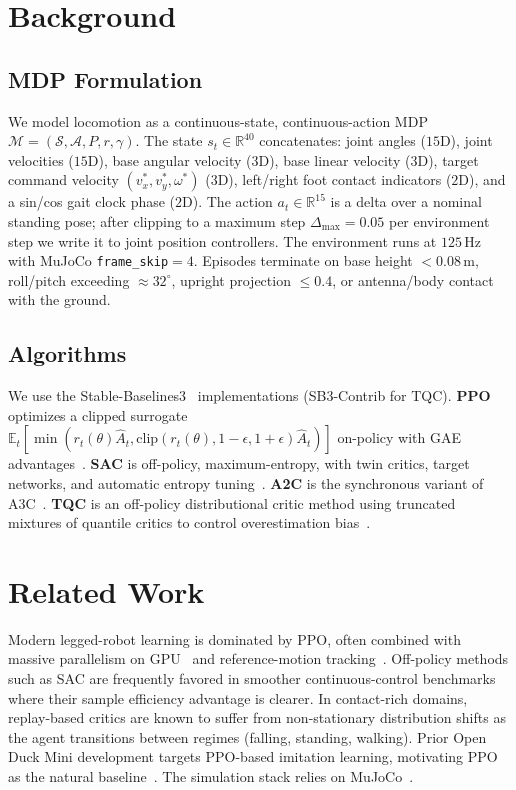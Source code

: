 \documentclass[letterpaper]{article}
\begin{document}
\section{Background}

\subsection{MDP Formulation}
We model locomotion as a continuous-state, continuous-action MDP
$\mathcal{M}=(\mathcal{S},\mathcal{A},P,r,\gamma)$.
The state $s_t\in\mathbb{R}^{40}$ concatenates:
joint angles ($15$D), joint velocities ($15$D), base angular velocity ($3$D), base linear velocity ($3$D), target command velocity $(v_x^*,v_y^*,\omega^*)$ ($3$D), left/right foot contact indicators ($2$D), and a sin/cos gait clock phase ($2$D).
The action $a_t\in\mathbb{R}^{15}$ is a delta over a nominal standing pose; after clipping to a maximum step $\Delta_{\max}=0.05$ per environment step we write it to joint position controllers. The environment runs at $125\,$Hz with MuJoCo \texttt{frame\_skip}$=4$. Episodes terminate on base height $<0.08\,$m, roll/pitch exceeding $\approx 32^{\circ}$, upright projection $\le 0.4$, or antenna/body contact with the ground.

\subsection{Algorithms}
We use the Stable-Baselines3~\citep{raffin2021sb3} implementations (SB3-Contrib for TQC).
\textbf{PPO} optimizes a clipped surrogate $\mathbb{E}_t[\min(r_t(\theta)\hat{A}_t, \text{clip}(r_t(\theta),1-\epsilon,1+\epsilon)\hat{A}_t)]$ on-policy with GAE advantages~\citep{schulman2017ppo}.
\textbf{SAC} is off-policy, maximum-entropy, with twin critics, target networks, and automatic entropy tuning~\citep{haarnoja2018sac}.
\textbf{A2C} is the synchronous variant of A3C~\citep{mnih2016a3c}.
\textbf{TQC} is an off-policy distributional critic method using truncated mixtures of quantile critics to control overestimation bias~\citep{kuznetsov2020tqc}.

\section{Related Work}
Modern legged-robot learning is dominated by PPO, often combined with massive parallelism on GPU~\citep{rudin2022legged} and reference-motion tracking~\citep{peng2018deepmimic}. Off-policy methods such as SAC are frequently favored in smoother continuous-control benchmarks where their sample efficiency advantage is clearer. In contact-rich domains, replay-based critics are known to suffer from non-stationary distribution shifts as the agent transitions between regimes (falling, standing, walking). Prior Open Duck Mini development targets PPO-based imitation learning, motivating PPO as the natural baseline~\citep{open_duck_mini}. The simulation stack relies on MuJoCo~\citep{todorov2012mujoco}.
\end{document}
